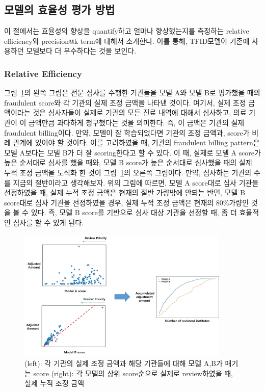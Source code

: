 \documentclass[11pt]{article}           %
\begin{document}
\subsection{모델의 효율성 평가 방법}
\label{3.2}
이 절에서는 효율성의 향상을 quantify하고 얼마나 향상했는지를 측정하는 relative efficiency와 precision@k term에 대해서 소개한다.
이를 통해, TFID모델이 기존에 사용하던 모델보다 더 우수하다는 것을 보인다.

\subsubsection{Relative Efficiency}
\label{3.2.1}

그림~\ref{fig:relative efficiency1}의 왼쪽 그림은 전문 심사를 수행한 기관들을 모델 A와 모델 B로 평가했을 때의 fraudulent score와 각 기관의 실제 조정 금액을 나타낸 것이다.
여기서, 실제 조정 금액이라는 것은 심사자들이 실제로 기관의 모든 진료 내역에 대해서 심사하고, 의료 기관이 이 금액만큼 과다하게 청구했다는 것을 의미한다.
즉, 이 금액은 기관의 실제 fraudulent billing이다.
만약, 모델이 잘 학습되었다면 기관의 조정 금액과, score가 비례 관계에 있어야 할 것이다.
이를 고려하였을 때, 기관의 fraudulent billing pattern은 모델 A보다는 모델 B가 더 잘 scoring한다고 할 수 있다.
이 때, 실제로 모델 A score가 높은 순서대로 심사를 했을 때와, 모델 B score가 높은 순서대로 심사했을 때의 실제 누적 조정 금액을 도식화 한 것이 그림~\ref{fig:relative efficiency1}의 오른쪽 그림이다.
만약, 심사하는 기관의 수를 지금의 절반이라고 생각해보자.
위의 그림에 따르면, 모델 A score대로 심사 기관을 선정하였을 때, 실제 누적 조정 금액은 현재의 절반 가량밖에 안되는 반면, 모델 B score대로 심사 기관을 선정하였을 경우, 실제 누적 조정 금액은 현재의 80\%가량인 것을 볼 수 있다.
즉, 모델 B score를 기반으로 심사 대상 기관을 선정할 때, 좀 더 효율적인 심사를 할 수 있게 된다.

\begin{figure}[h]
   \centering
   \vspace{0.5cm}
   \includegraphics[width=0.9\textwidth]{[figure5]relative_efficiency1.jpg}
   \vspace{-0.5cm}
   \caption{(left): 각 기관의 실제 조정 금액과 해당 기관들에 대해 모델 A,B가 매기는 score (right): 각 모델의 상위 score순으로 실제로 review하였을 때, 실제 누적 조정 금액}
   \vspace{0.5cm}
   \label{fig:relative efficiency1}
\end{figure}
\end{document}
